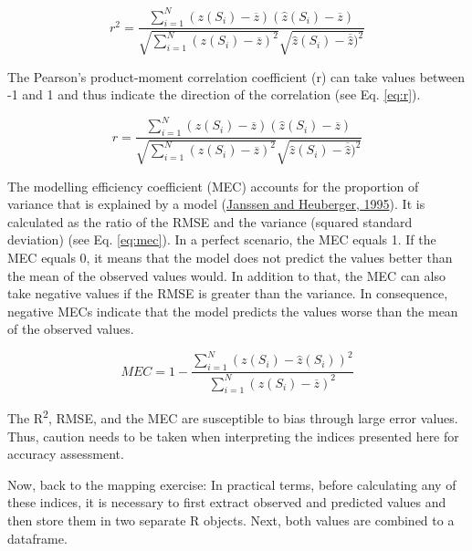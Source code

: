 \documentclass[
  10pt,
  b5paper,
  oneside]{book}
\newenvironment{Shaded}{\begin{snugshade}}{\end{snugshade}}
\newcommand{\CommentTok}[1]{\textcolor[rgb]{0.56,0.35,0.01}{\textit{#1}}}
\newcommand{\FunctionTok}[1]{\textcolor[rgb]{0.00,0.00,0.00}{#1}}
\newcommand{\NormalTok}[1]{#1}
\newcommand{\OtherTok}[1]{\textcolor[rgb]{0.56,0.35,0.01}{#1}}
\newcommand{\SpecialCharTok}[1]{\textcolor[rgb]{0.00,0.00,0.00}{#1}}
\begin{document}
\begin{equation} 
  r^2 = \frac{\sum_{i=1}^{N}(z(S_{i})-\overline{z})(\hat{z}(S_{i})-\overline{z})}{\sqrt{\sum_{i=1}^{N}(z(S_{i})-\overline{z})^2}\sqrt{\hat{z}(S_{i})-\overline{\hat{z}})^2}}
  \label{eq:r2}
\end{equation}

The Pearson's product-moment correlation coefficient (r) can take values between -1 and 1 and thus indicate the direction of the correlation (see Eq. \eqref{eq:r}).

\begin{equation} 
  r = \frac{\sum_{i=1}^{N}(z(S_{i})-\overline{z})(\hat{z}(S_{i})-\overline{z})}{\sqrt{\sum_{i=1}^{N}(z(S_{i})-\overline{z})^2}\sqrt{\hat{z}(S_{i})-\overline{\hat{z}})^2}}
  \label{eq:r}
\end{equation}

The modelling efficiency coefficient (MEC) accounts for the proportion of variance that is explained by a model (\protect\hyperlink{ref-Janssen1995}{Janssen and Heuberger, 1995}). It is calculated as the ratio of the RMSE and the variance (squared standard deviation) (see Eq. \eqref{eq:mec}). In a perfect scenario, the MEC equals 1. If the MEC equals 0, it means that the model does not predict the values better than the mean of the observed values would. In addition to that, the MEC can also take negative values if the RMSE is greater than the variance. In consequence, negative MECs indicate that the model predicts the values worse than the mean of the observed values.

\begin{equation} 
  MEC = 1 - \frac{\sum_{i=1}^{N}(z(S_{i})-\hat{z}(S_{i}))^2}{\sum_{i=1}^{N}(z(S_{i})-\overline{z})^2}
  \label{eq:mec}
\end{equation}

The R\textsuperscript{2}, RMSE, and the MEC are susceptible to bias through large error values. Thus, caution needs to be taken when interpreting the indices presented here for accuracy assessment.

Now, back to the mapping exercise: In practical terms, before calculating any of these indices, it is necessary to first extract observed and predicted values and then store them in two separate R objects. Next, both values are combined to a dataframe.

\begin{Shaded}
\end{Shaded}
\end{document}
